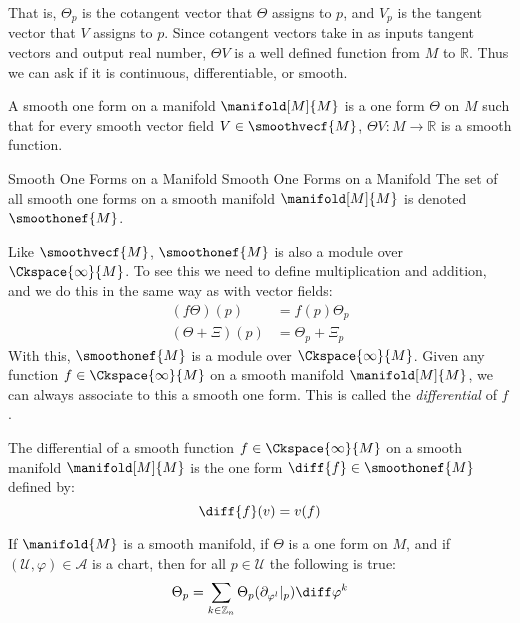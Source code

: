 \documentclass{article}                                                        %
\begin{document}
            That is, $\Theta_{p}$ is the cotangent vector that $\Theta$ assigns
            to $p$, and $V_{p}$ is the tangent vector that $V$ assigns to $p$.
            Since cotangent vectors take in as inputs tangent vectors and output
            real number, $\Theta{V}$ is a well defined function from $M$ to
            $\mathbb{R}$. Thus we can ask if it is continuous, differentiable,
            or smooth.
            \begin{definition}
                A smooth one form on a manifold $\manifold[M]{M}$ is a one form
                $\Theta$ on $M$ such that for every smooth vector field
                $V\in\smoothvecf{M}$, $\Theta{V}:M\rightarrow\mathbb{R}$ is a
                smooth function.
            \end{definition}
            \begin{fnotation}{Smooth One Forms on a Manifold}
                             {Smooth One Forms on a Manifold}
                The set of all smooth one forms on a smooth manifold
                $\manifold[M]{M}$ is denoted $\smoothonef{M}$.
            \end{fnotation}
            Like $\smoothvecf{M}$, $\smoothonef{M}$ is also a module over
            $\Ckspace{\infty}{M}$. To see this we need to define multiplication
            and addition, and we do this in the same way as with vector fields:
            \begin{align}
                (f\Theta)(p)&=f(p)\Theta_{p}\\
                (\Theta+\Xi)(p)&=\Theta_{p}+\Xi_{p}
            \end{align}
            With this, $\smoothonef{M}$ is a module over $\Ckspace{\infty}{M}$.
            Given any function $f\in\Ckspace{\infty}{M}$ on a smooth manifold
            $\manifold[M]{M}$, we can always associate to this a smooth one
            form. This is called the \textit{differential} of $f$.
            \begin{definition}
                The differential of a smooth function $f\in\Ckspace{\infty}{M}$
                on a smooth manifold $\manifold[M]{M}$ is the one form
                $\diff{f}\in\smoothonef{M}$ defined by:
                \begin{equation}
                    \diff{f}(v)=v(f)
                \end{equation}
            \end{definition}
            \begin{theorem}
                If $\manifold{M}$ is a smooth manifold, if $\Theta$ is a one
                form on $M$, and if $(\mathcal{U},\varphi)\in\mathcal{A}$ is a
                chart, then for all $p\in\mathcal{U}$ the following is true:
                \begin{equation}
                    \Theta_{p}=\sum_{k\in\mathbb{Z}_{n}}
                        \Theta_{p}(\partial_{\varphi^{l}}|_{p})\diff\varphi^{k}
                \end{equation}
            \end{theorem}
\end{document}
